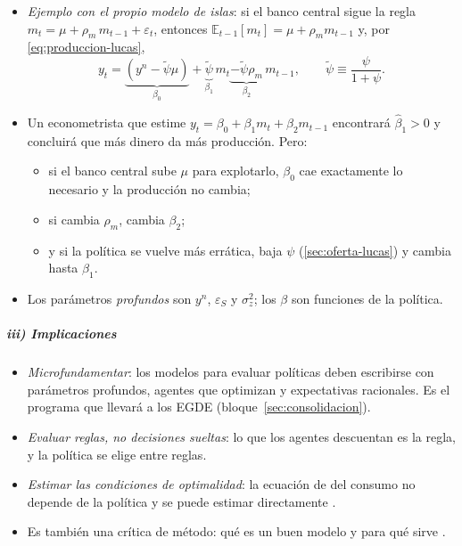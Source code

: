 \documentclass[11pt]{article}
\begin{document}
\begin{itemize}
\item \emph{Ejemplo con el propio modelo de islas}: si el banco central sigue la regla $m_t=\mu+\rho_m\,m_{t-1}+\varepsilon_t$, entonces $\mathbb{E}_{t-1}[m_t]=\mu+\rho_m m_{t-1}$ y, por \eqref{eq:produccion-lucas},
  \begin{equation}\label{eq:forma-reducida}
  y_t=\underbrace{(y^n-\tilde\psi\mu)}_{\beta_0}+\underbrace{\tilde\psi}_{\beta_1}\,m_t\underbrace{-\tilde\psi\rho_m}_{\beta_2}\,m_{t-1},\qquad \tilde\psi\equiv\frac{\psi}{1+\psi}.
  \end{equation}
\item Un econometrista que estime $y_t=\beta_0+\beta_1m_t+\beta_2m_{t-1}$ encontrará $\hat\beta_1>0$ y concluirá que más dinero da más producción. Pero:
  \begin{itemize}
  \item si el banco central sube $\mu$ para explotarlo, $\beta_0$ cae exactamente lo necesario y la producción no cambia;
  \item si cambia $\rho_m$, cambia $\beta_2$;
  \item y si la política se vuelve más errática, baja $\psi$ (\ref{sec:oferta-lucas}) y cambia hasta $\beta_1$.
  \end{itemize}
\item Los parámetros \emph{profundos} son $y^n$, $\varepsilon_S$ y $\sigma^2_z$; los $\beta$ son funciones de la política.
\end{itemize}

\subparagraph{iii) Implicaciones}

\begin{itemize}
\item \emph{Microfundamentar}: los modelos para evaluar políticas deben escribirse con parámetros profundos, agentes que optimizan y expectativas racionales. Es el programa que llevará a los EGDE (bloque~\ref{sec:consolidacion}).
\item \emph{Evaluar reglas, no decisiones sueltas}: lo que los agentes descuentan es la regla, y la política se elige entre reglas.
\item \emph{Estimar las condiciones de optimalidad}: la ecuación de  del consumo no depende de la política y se puede estimar directamente\nocite{Hall1978,HansenSingleton1983Stochastic} .
\item Es también una crítica de método: qué es un buen modelo y para qué sirve .
\end{itemize}
\end{document}

